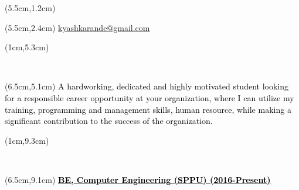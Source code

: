 \documentclass[10pt,a4paper,twocolumn]{article}
\begin{document}
\begin{center}
\begin{textblock*}{10cm}(5.5cm,1.2cm)
   \textcolor{white}{\fontsize{30}{40}\selectfont Yash Karande}
\end{textblock*}
\begin{textblock*}{10cm}(5.5cm,2.4cm)
\textcolor{white}{\fontsize{12}{15}\selectfont \href {mailto:kyashkarande@gmail.com} {kyashkarande@gmail.com} | +91-7776831611}
\end{textblock*}
\end{center}
\begin{textblock*}{3.9cm}(1cm,5.3cm)
   \begin{mdframed}[style=Frame1]
   \textcolor{white}{\fontsize{20}{20}\selectfont Summary }
   \end{mdframed}
\end{textblock*}
\begin{textblock*}{14cm}(6.5cm,5.1cm)
   \textcolor{black}{\fontsize{15}{20}\selectfont A hardworking, dedicated and highly motivated student looking for a responsible career opportunity at your organization, where I can utilize my training, programming and management skills, human resource, while making a significant contribution to the success of the organization.}
\end{textblock*}
\begin{textblock*}{4cm}(1cm,9.3cm)
   \begin{mdframed}[style=Frame1]
   \textcolor{white}{\fontsize{20}{20}\selectfont Education}
   \end{mdframed}
\end{textblock*}
\begin{textblock*}{14cm}(6.5cm,9.1cm)
   \textcolor{black}{\fontsize{15}{20}\selectfont \underline{\textbf{BE, Computer Engineering (SPPU) \hspace{20mm}(2016-Present)}}\vspace{1mm} }
\end{textblock*}
\end{document}

